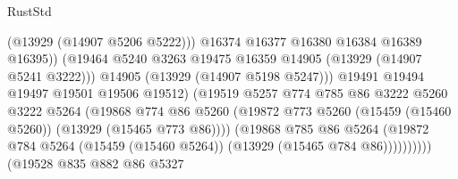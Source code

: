 \begin{lexlean}{RustStd}
\begin{coremodule}
                                              (@13929 (@14907 @5206 @5222)))
                                            @16374
                                            @16377
                                            @16380
                                            @16384
                                            @16389
                                            @16395))
                                        (@19464
                                          @5240
                                          @3263
                                          @19475
                                          @16359
                                          @14905
                                          (@13929 (@14907 @5241 @3222)))
                                        @14905
                                        (@13929 (@14907 @5198 @5247)))
                                      @19491
                                      @19494
                                      @19497
                                      @19501
                                      @19506
                                      @19512)
                                    (@19519
                                      @5257
                                      @774
                                      @785
                                      @86
                                      @3222
                                      @5260
                                      @3222
                                      @5264
                                      (@19868
                                        @774
                                        @86
                                        @5260
                                        (@19872
                                          @773
                                          @5260
                                          (@15459 (@15460 @5260))
                                          (@13929 (@15465 @773 @86))))
                                      (@19868
                                        @785
                                        @86
                                        @5264
                                        (@19872
                                          @784
                                          @5264
                                          (@15459 (@15460 @5264))
                                          (@13929 (@15465 @784 @86))))))))))
                          (@19528
                            @835
                            @882
                            @86
                            @5327

\end{coremodule}
\end{lexlean}
